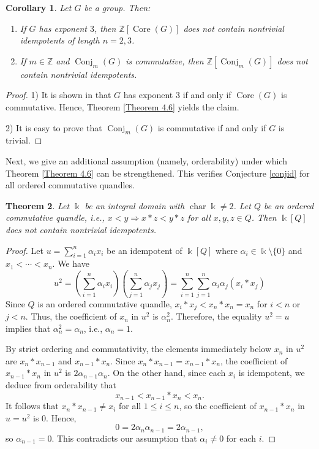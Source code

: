 \documentclass[12 pt]{amsart}
\newtheorem{theorem}{Theorem}[section]
\newtheorem{corollary}[theorem]{Corollary}
\theoremstyle{definition}
\theoremstyle{remark}
\numberwithin{equation}{section}
\newcommand{\Z}{\mathbb{Z}}
\renewcommand{\k}{\Bbbk}
\newcommand{\chara}{\operatorname{char}}
\begin{document}
\begin{corollary}
 Let $G$ be a group. Then: 
   \begin{enumerate}
       \item 
    If $G$ has exponent $3$, then $\mathbb{Z}[\operatorname{Core}(G)]$ does not contain nontrivial idempotents of length  $n=2,3$.
    \item If $m\in\Z$ and  $\operatorname{Conj}_m(G)$ is commutative, then $\mathbb{Z}[\operatorname{Conj}_{m}(G)]$ does not contain nontrivial idempotents.
    \end{enumerate} 
\end{corollary}
\begin{proof}
1) It is shown in \cite[Prop.\ 3.1]{LT} that $G$ has exponent $3$ if and only if $\operatorname{Core}(G)$ is commutative. Hence, Theorem \ref{Theorem 4.6} yields the claim.

2) It is easy to prove that $\operatorname{Conj}_m(G)$ is commutative if and only if $G$ is trivial.
\end{proof}

Next, we give an additional assumption (namely, orderability) under which Theorem \ref{Theorem 4.6} can be strengthened. This verifies Conjecture \ref{conjid} for all ordered commutative quandles.

\begin{theorem}\label{Theorem 4.8}
    Let $\k$ be an integral domain with $\chara\k\neq 2$. Let $Q$ be an ordered commutative quandle, i.e., $x<y \Rightarrow x*z<y*z$ for all $x,y,z \in Q$. Then $\k[Q]$ does not contain nontrivial idempotents.
\end{theorem}
\begin{proof}
   Let $u=\sum_{i=1}^{n}\alpha_i x_i$ be an idempotent of $\k[Q]$ where $\alpha_i\in\k\setminus\{0\}$ and $x_1<\cdots<x_n$.
We have $$u^{2}=\left(\sum_{i=1}^{n}\alpha_i x_i\right)\left(\sum_{j=1}^{n}\alpha_j x_j\right)=\sum_{i=1}^{n}\sum_{j=1}^{n}\alpha_i\alpha_j (x_i\ast x_j)$$
  Since $Q$ is an ordered commutative quandle, $x_i \ast x_j < x_n \ast x_n = x_n$ for $i < n$ or $j < n$. Thus, the coefficient of $x_n$ in $u^2$ is $\alpha_n^2$. Therefore, the equality $u^2 = u$ implies that $\alpha_n^2 = \alpha_n$, i.e., $\alpha_n = 1$. 

  By strict ordering and commutativity, the elements immediately below $x_n$ in $u^2$ are $x_n \ast x_{n-1}$ and $x_{n-1} \ast x_n$. 
  Since $x_n \ast x_{n-1} = x_{n-1} \ast x_n$, the coefficient of $x_{n-1} \ast x_n$ in $u^2$ is $2\alpha_{n-1} \alpha_n$. 
  On the other hand, since each $x_i$ is idempotent, we deduce from orderability that
  \[
  x_{n-1}<x_{n-1}*x_n<x_n.
  \]
  It follows that $x_n\ast x_{n-1}\neq x_i$ for all $1\leq i\leq n$, so the coefficient of $x_{n-1}*x_n$ in $u=u^2$ is $0$. Hence,
  \[
  0=2\alpha_n \alpha_{n-1}=2\alpha_{n-1},
  \]
  so $\alpha_{n-1} = 0$. This contradicts our assumption that $\alpha_i\neq 0$ for each $i$.  
\end{proof}
\end{document}
